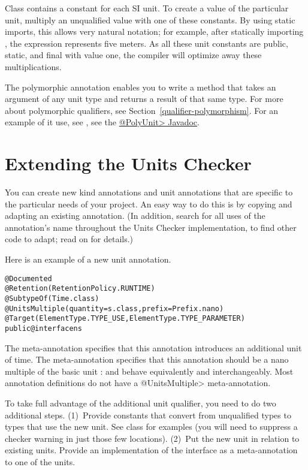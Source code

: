 Class  contains a constant for each SI unit.
To create a value of the particular unit, multiply an unqualified
value with one of these constants.
By using static imports, this allows very natural notation; for
example, after statically importing ,
the expression  represents five meters.
As all these unit constants are public, static, and final with value
one, the compiler will optimize away these multiplications.


The polymorphic annotation 
enables you to write a method that takes an argument of any unit type and
returns a result of that same type.  For more about polymorphic qualifiers,
see Section~\ref{qualifier-polymorphism}.  For an example of it use, see 
, see the
\href{api/org/checkerframework/checker/units/qual/PolyUnit.html}{\<@PolyUnit>
Javadoc}.


\section{Extending the Units Checker\label{extending-units}}

You can create new kind annotations and unit annotations that are specific
to the particular needs of your project.  An easy way to do this is by
copying and adapting an existing annotation.  (In addition, search for all
uses of the annotation's name throughout the Units Checker implementation,
to find other code to adapt; read on for details.)

Here is an example of a new unit annotation.

\begin{alltt}
@Documented
@Retention(RetentionPolicy.RUNTIME)
@SubtypeOf( \ttlcb{} Time.class \ttrcb{} )
@UnitsMultiple(quantity=s.class, prefix=Prefix.nano)
@Target({ElementType.TYPE_USE, ElementType.TYPE_PARAMETER})
public @interface ns \ttlcb{}\ttrcb{}
\end{alltt}

The  meta-annotation specifies that this annotation
introduces an additional unit of time.
The  meta-annotation specifies that this annotation
should be a nano multiple of the basic unit :   and
behave equivalently and interchangeably.
Most annotation definitions do not have a \<@UnitsMultiple> meta-annotation.


To take full advantage of the additional unit qualifier, you need to
do two additional steps.
(1)~Provide constants that convert from unqualified types to types that use
the new unit.
See class  for examples (you will need to suppress a
checker warning in just those few locations).
(2)~Put the new unit in relation to existing units.
Provide an
implementation of the  interface as a
meta-annotation to one of the units.

